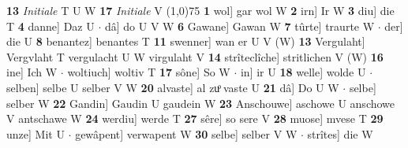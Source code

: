 \documentclass[8pt,a4paper,notitlepage]{article}
\begin{document}
\begin{table}[ht]
\begin{minipage}[t]{0.5\linewidth}
\textbf{13} \textit{Initiale} T U W  \textbf{17} \textit{Initiale} V  \newline
\line(1,0){75} \newline
\textbf{1} wol] gar wol W \textbf{2} irn] Ir W \textbf{3} diu] die T \textbf{4} danne] Daz U  $\cdot$ dâ] do U V W \textbf{6} Gawane] Gawan W \textbf{7} tûrte] traurte W  $\cdot$ der] die U \textbf{8} benantez] benantes T \textbf{11} swenner] wan er U V (W) \textbf{13} Vergulaht] Vergvlaht T vergulacht U W virgulaht V \textbf{14} strîteclîche] stritlichen V (W) \textbf{16} ine] Ich W  $\cdot$ woltiuch] woltiv T \textbf{17} sône] So W  $\cdot$ in] ir U \textbf{18} welle] wolde U  $\cdot$ selben] selbe U selber V W \textbf{20} alvaste] al zuͦ vaste U \textbf{21} dâ] Do U W  $\cdot$ selbe] selber W \textbf{22} Gandin] Gaudin U gaudein W \textbf{23} Anschouwe] aschowe U anschowe V antschawe W \textbf{24} werdiu] werde T \textbf{27} sêre] so sere V \textbf{28} muose] mvese T \textbf{29} unze] Mit U  $\cdot$ gewâpent] verwapent W \textbf{30} selbe] selber V W  $\cdot$ strîtes] die W \newline
\end{minipage}
\end{table}
\end{document}
